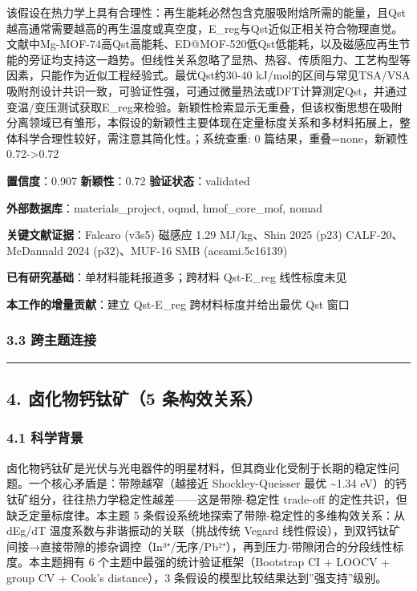 \documentclass[12pt,a4paper]{ctexart}
\begin{document}
该假设在热力学上具有合理性：再生能耗必然包含克服吸附焓所需的能量，且Qst越高通常需要越高的再生温度或真空度，E\_reg与Qst近似正相关符合物理直觉。文献中Mg-MOF-74高Qst高能耗、ED@MOF-520低Qst低能耗，以及磁感应再生节能的旁证均支持这一趋势。但线性关系忽略了显热、热容、传质阻力、工艺构型等因素，只能作为近似工程经验式。最优Qst约30-40 kJ/mol的区间与常见TSA/VSA吸附剂设计共识一致，可验证性强，可通过微量热法或DFT计算测定Qst，并通过变温/变压测试获取E\_reg来检验。新颖性检索显示无重叠，但该权衡思想在吸附分离领域已有雏形，本假设的新颖性主要体现在定量标度关系和多材料拓展上，整体科学合理性较好，需注意其简化性。；系统查重: 0 篇结果，重叠=none，新颖性 0.72-\textgreater0.72

\textbf{置信度}：0.907 \textbar{} \textbf{新颖性}：0.72 \textbar{} \textbf{验证状态}：validated

\textbf{外部数据库}：materials\_project, oqmd, hmof\_core\_mof, nomad

\textbf{关键文献证据}：Falcaro (v3s5) 磁感应 1.29 MJ/kg、Shin 2025 (p23) CALF-20、McDannald 2024 (p32)、MUF-16 SMB (acsami.5c16139)

\textbf{已有研究基础}：单材料能耗报道多；跨材料 Qst-E\_reg 线性标度未见

\textbf{本工作的增量贡献}：建立 Qst-E\_reg 跨材料标度并给出最优 Qst 窗口

\subsubsection{3.3 跨主题连接}\label{ux8de8ux4e3bux9898ux8fdeux63a5}

\begin{center}\rule{0.5\linewidth}{0.5pt}\end{center}

\subsection{4. 卤化物钙钛矿（5 条构效关系）}\label{ux5364ux5316ux7269ux9499ux949bux77ff5-ux6761ux6784ux6548ux5173ux7cfb}

\subsubsection{4.1 科学背景}\label{ux79d1ux5b66ux80ccux666f-2}

卤化物钙钛矿是光伏与光电器件的明星材料，但其商业化受制于长期的稳定性问题。一个核心矛盾是：带隙越窄（越接近 Shockley-Queisser 最优 \textasciitilde1.34 eV）的钙钛矿组分，往往热力学稳定性越差------这是带隙-稳定性 trade-off 的定性共识，但缺乏定量标度律。本主题 5 条假设系统地探索了带隙-稳定性的多维构效关系：从 dEg/dT 温度系数与非谐振动的关联（挑战传统 Vegard 线性假设），到双钙钛矿间接→直接带隙的掺杂调控（In³⁺/无序/Pb²⁺），再到压力-带隙闭合的分段线性标度。本主题拥有 6 个主题中最强的统计验证框架（Bootstrap CI + LOOCV + group CV + Cook's distance），3 条假设的模型比较结果达到''强支持''级别。
\end{document}
